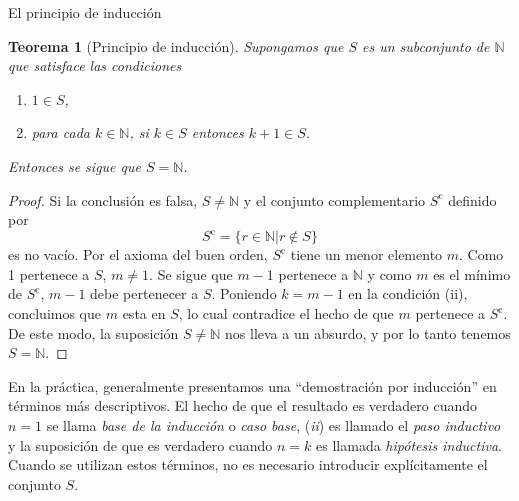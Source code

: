 \documentclass[11pt,spanish,makeidx]{amsbook}
\newtheorem{teorema}{Teorema}[section]
\theoremstyle{definition}
\theoremstyle{remark}
\begin{document}
\begin{section}{El principio de inducción}
\begin{teorema}[Principio de inducción]\label{t1.4} Supongamos que $S$ es un subconjunto de $\mathbb N$ que satisface las condiciones 
\begin{enumerate}
\item[(\em i)] $1 \in S$,
\item[(\em ii)] para cada $k \in \mathbb N$, si $ k \in S$ entonces $k+1\in S$.
\end{enumerate}
Entonces se sigue que $S=\mathbb N$.
\end{teorema}
\begin{proof}Si la conclusión es falsa, $S \not= \mathbb N$ y el conjunto complementario $S^{\text{c}}$ definido por
$$
S^{\text{c}}= \{ r \in \mathbb N | r\not\in S\}
$$
es no vacío. Por el axioma del buen orden, $S^{\text{c}}$ tiene un menor elemento $m$. Como 1 pertenece a $S$, $m\not=1$. Se sigue que $m-1$ pertenece a $\mathbb N$ y como $m$ es el mínimo de $S^{\text{c}}$, $m-1$ debe pertenecer a $S$. Poniendo $k=m-1$ en la condición (ii), concluimos que $m$ esta en $S$, lo cual contradice el hecho de que $m$ pertenece a $S^{\text{c}}$. De este modo, la suposición $S \not= \mathbb N$ nos lleva a un absurdo, y por lo tanto tenemos $S= \mathbb N$.
\end{proof}

En la práctica, generalmente presentamos una ``demostración por inducción'' en términos más descriptivos. El hecho de que el resultado es verdadero cuando $n=1$ se llama {\it base de la inducción} o {\it caso base}, ({\em ii}) es llamado  el {\em paso inductivo} y la suposición de que es verdadero cuando $n=k$ es llamada {\it hipótesis inductiva}. Cuando se utilizan estos términos, no es necesario introducir explícitamente el conjunto $S$.


\end{section}
\end{document}
